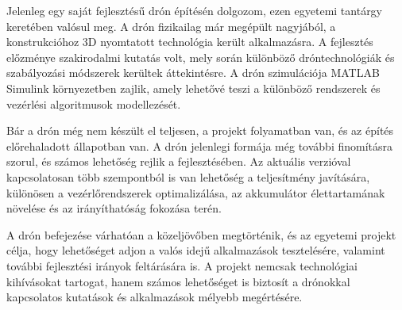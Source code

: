 Jelenleg egy saját fejlesztésű drón építésén dolgozom, ezen egyetemi tantárgy keretében valósul meg. A drón fizikailag már megépült nagyjából, a konstrukcióhoz 3D nyomtatott technológia került alkalmazásra. A fejlesztés előzménye szakirodalmi kutatás volt, mely során különböző dróntechnológiák és szabályozási módszerek kerültek áttekintésre. A drón szimulációja MATLAB Simulink környezetben zajlik, amely lehetővé teszi a különböző rendszerek és vezérlési algoritmusok modellezését.

Bár a drón még nem készült el teljesen, a projekt folyamatban van, és az építés előrehaladott állapotban van. A drón jelenlegi formája még további finomításra szorul, és számos lehetőség rejlik a fejlesztésében. Az aktuális verzióval kapcsolatosan több szempontból is van lehetőség a teljesítmény javítására, különösen a vezérlőrendszerek optimalizálása, az akkumulátor élettartamának növelése és az irányíthatóság fokozása terén.

A drón befejezése várhatóan a közeljövőben megtörténik, és az egyetemi projekt célja, hogy lehetőséget adjon a valós idejű alkalmazások tesztelésére, valamint további fejlesztési irányok feltárására is. A projekt nemcsak technológiai kihívásokat tartogat, hanem számos lehetőséget is biztosít a drónokkal kapcsolatos kutatások és alkalmazások mélyebb megértésére.